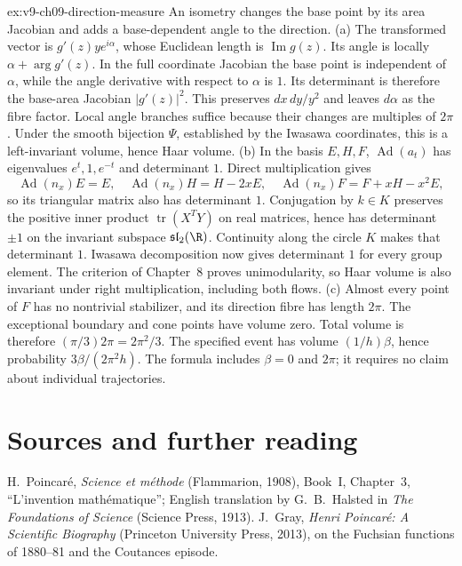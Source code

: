\begin{solution}{ex:v9-ch09-direction-measure}
\idea An isometry changes the base point by its area Jacobian and adds a base-dependent angle to the direction.
\writeup (a) The transformed vector is $g'(z)y e^{i\alpha}$, whose Euclidean length is $\operatorname{Im}g(z)$. Its angle is locally $\alpha+\arg g'(z)$. In the full coordinate Jacobian the base point is independent of $\alpha$, while the angle derivative with respect to $\alpha$ is $1$. Its determinant is therefore the base-area Jacobian $|g'(z)|^2$. This preserves $dx\,dy/y^2$ and leaves $d\alpha$ as the fibre factor. Local angle branches suffice because their changes are multiples of $2\pi$. Under the smooth bijection $\Psi$, established by the Iwasawa coordinates, this is a left-invariant volume, hence Haar volume.
(b) In the basis $E,H,F$, $\operatorname{Ad}(a_t)$ has eigenvalues $e^t,1,e^{-t}$ and determinant $1$. Direct multiplication gives
\[
\operatorname{Ad}(n_x)E=E,\quad
\operatorname{Ad}(n_x)H=H-2xE,\quad
\operatorname{Ad}(n_x)F=F+xH-x^2E,
\]
so its triangular matrix also has determinant $1$. Conjugation by $k\in K$ preserves the positive inner product $\operatorname{tr}(X^TY)$ on real matrices, hence has determinant $\pm1$ on the invariant subspace $\mathfrak{sl}_2(\R)$. Continuity along the circle $K$ makes that determinant $1$. Iwasawa decomposition now gives determinant $1$ for every group element. The criterion of Chapter~8 proves unimodularity, so Haar volume is also invariant under right multiplication, including both flows.
(c) Almost every point of $F$ has no nontrivial stabilizer, and its direction fibre has length $2\pi$. The exceptional boundary and cone points have volume zero. Total volume is therefore $(\pi/3)2\pi=2\pi^2/3$. The specified event has volume $(1/h)\beta$, hence probability
$3\beta/(2\pi^2h)$. The formula includes $\beta=0$ and $2\pi$; it requires no claim about individual trajectories.
\end{solution}

\section*{Sources and further reading}

H.~Poincaré, \emph{Science et méthode} (Flammarion, 1908), Book~I, Chapter~3, ``L'invention mathématique''; English translation by G.~B.~Halsted in \emph{The Foundations of Science} (Science
Press, 1913). J.~Gray, \emph{Henri Poincaré: A Scientific Biography} (Princeton University Press, 2013), on the Fuchsian functions of 1880--81 and the Coutances episode.


